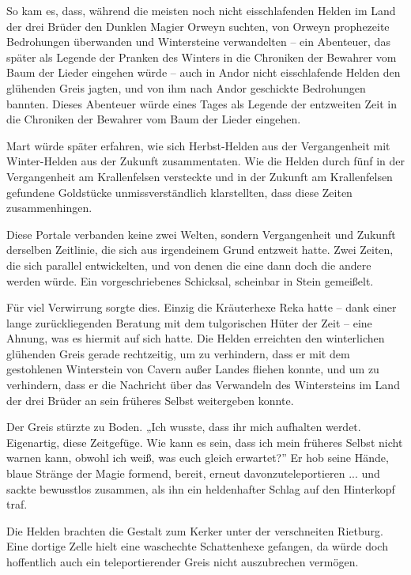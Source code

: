 
So kam es, dass, während die meisten noch nicht eisschlafenden Helden im Land der drei Brüder den Dunklen Magier Orweyn suchten, von Orweyn prophezeite Bedrohungen überwanden und Wintersteine verwandelten – ein Abenteuer, das später als Legende der Pranken des Winters in die Chroniken der Bewahrer vom Baum der Lieder eingehen würde – auch in Andor nicht eisschlafende Helden den glühenden Greis jagten, und von ihm nach Andor geschickte Bedrohungen bannten. Dieses Abenteuer würde eines Tages als Legende der entzweiten Zeit in die Chroniken der Bewahrer vom Baum der Lieder eingehen. 

Mart würde später erfahren, wie sich Herbst-Helden aus der Vergangenheit mit Winter-Helden aus der Zukunft zusammentaten. Wie die Helden durch fünf in der Vergangenheit am Krallenfelsen versteckte und in der Zukunft am Krallenfelsen gefundene Goldstücke unmissverständlich klarstellten, dass diese Zeiten zusammenhingen. 

Diese Portale verbanden keine zwei Welten, sondern Vergangenheit und Zukunft derselben Zeitlinie, die sich aus irgendeinem Grund entzweit hatte. Zwei Zeiten, die sich parallel entwickelten, und von denen die eine dann doch die andere werden würde. Ein vorgeschriebenes Schicksal, scheinbar in Stein gemeißelt.

Für viel Verwirrung sorgte dies. Einzig die Kräuterhexe Reka hatte – dank einer lange zurückliegenden Beratung mit dem tulgorischen Hüter der Zeit – eine Ahnung, was es hiermit auf sich hatte. Die Helden erreichten den winterlichen glühenden Greis gerade rechtzeitig, um zu verhindern, dass er mit dem gestohlenen Winterstein von Cavern außer Landes fliehen konnte, und um zu verhindern, dass er die Nachricht über das Verwandeln des Wintersteins im Land der drei Brüder an sein früheres Selbst weitergeben konnte.



\trennzeichen



Der Greis stürzte zu Boden. „Ich wusste, dass ihr mich aufhalten werdet. Eigenartig, diese Zeitgefüge. Wie kann es sein, dass ich mein früheres Selbst nicht warnen kann, obwohl ich weiß, was euch gleich erwartet?” Er hob seine Hände, blaue Stränge der Magie formend, bereit, erneut davonzuteleportieren ... und sackte bewusstlos zusammen, als ihn ein heldenhafter Schlag auf den Hinterkopf traf.

Die Helden brachten die Gestalt zum Kerker unter der verschneiten Rietburg. Eine dortige Zelle hielt eine waschechte Schattenhexe gefangen, da würde doch hoffentlich auch ein teleportierender Greis nicht auszubrechen vermögen.

